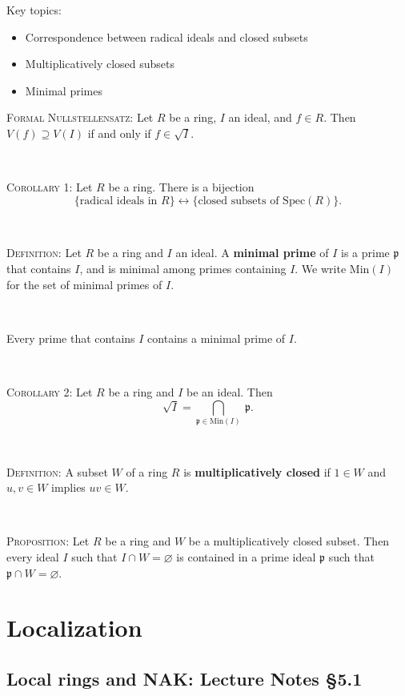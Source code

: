 \documentclass[12pt]{amsart}
\newcommand{\p}{\mathfrak{p}}
\newcommand{\0}{$\phantom{.}$}
\newcommand{\1}{\mathbbm{1}}
\begin{document}
\begin{framed} Key topics:
\begin{itemize}
\item Correspondence between radical ideals and closed subsets
\item Multiplicatively closed subsets
\item Minimal primes
\end{itemize}
\end{framed}



\noindent \textsc{Formal Nullstellensatz:} Let $R$ be a ring,  $I$ an ideal, and $f\in R$. Then $V(f) \supseteq V(I)$ if and only if $f\in \sqrt{I}$.



\

\noindent \textsc{Corollary 1:} Let $R$ be a ring. There is a bijection
\[ \{ \text{radical ideals in $R$}\}  \longleftrightarrow \{ \text{closed subsets of $\mathrm{Spec}(R)$}\}.\]

\

\noindent \textsc{Definition:} Let $R$ be a ring and $I$ an ideal. A \textbf{minimal prime} of $I$ is a prime $\p$ that contains $I$, and is minimal among primes containing $I$. We write $\mathrm{Min}(I)$ for the set of minimal primes of $I$.


\

 Every prime that contains $I$ contains a minimal prime of $I$.

\

\noindent \textsc{Corollary 2:} Let $R$ be a ring and $I$ be an ideal. Then
\[ \sqrt{I} = \bigcap_{\p \in \mathrm{Min}(I)} \ \p.\]


\


\noindent \textsc{Definition:} A subset $W$ of a ring $R$ is \textbf{multiplicatively closed} if $1\in W$ and $u,v\in W$ implies $uv\in W$.

\

\noindent \textsc{Proposition:} Let $R$ be a ring and $W$ be a multiplicatively closed subset. Then every ideal $I$ such that $I\cap W = \varnothing$ is contained in a prime ideal $\p$ such that $\p \cap W = \varnothing$.


\newpage


\section{Localization}
\setcounter{subsection}{19}
\subsection{Local rings and NAK: Lecture Notes \S5.1} \0
\end{document}
